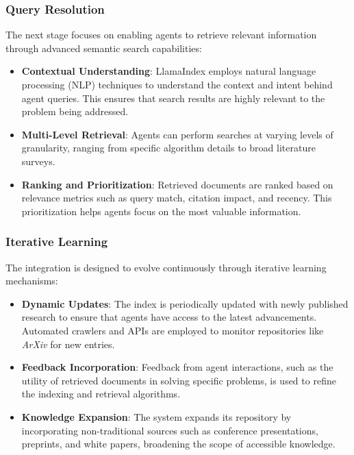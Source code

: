 \documentclass[12pt]{article}
\begin{document}
\subsubsection{Query Resolution}
The next stage focuses on enabling agents to retrieve relevant information through advanced semantic search capabilities:
\begin{itemize}
    \item \textbf{Contextual Understanding}: LlamaIndex employs natural language processing (NLP) techniques to understand the context and intent behind agent queries. This ensures that search results are highly relevant to the problem being addressed.
    \item \textbf{Multi-Level Retrieval}: Agents can perform searches at varying levels of granularity, ranging from specific algorithm details to broad literature surveys.
    \item \textbf{Ranking and Prioritization}: Retrieved documents are ranked based on relevance metrics such as query match, citation impact, and recency. This prioritization helps agents focus on the most valuable information.
\end{itemize}

\subsubsection{Iterative Learning}
The integration is designed to evolve continuously through iterative learning mechanisms:
\begin{itemize}
    \item \textbf{Dynamic Updates}: The index is periodically updated with newly published research to ensure that agents have access to the latest advancements. Automated crawlers and APIs are employed to monitor repositories like \textit{ArXiv} for new entries.
    \item \textbf{Feedback Incorporation}: Feedback from agent interactions, such as the utility of retrieved documents in solving specific problems, is used to refine the indexing and retrieval algorithms.
    \item \textbf{Knowledge Expansion}: The system expands its repository by incorporating non-traditional sources such as conference presentations, preprints, and white papers, broadening the scope of accessible knowledge.
\end{itemize}
\end{document}
